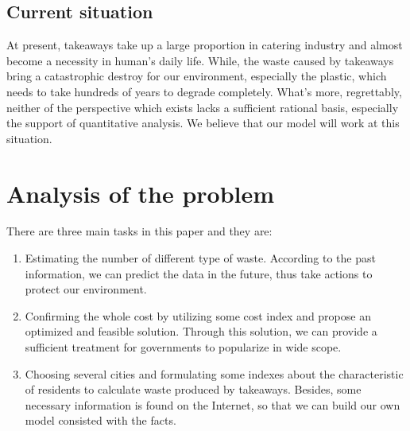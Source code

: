 \documentclass[UTF8]{article}
\begin{document}
\subsection{Current situation}
At present, takeaways take up a large proportion in catering industry and almost become a necessity in human’s daily life. While, the waste caused by takeaways bring a catastrophic destroy for our environment, especially the plastic, which needs to take hundreds of years to degrade completely. What’s more, regrettably, neither of the perspective which exists lacks a sufficient rational basis, especially the support of quantitative analysis. We believe that our model will work at this situation.
\newpage

\section{Analysis of the problem}
There are three main tasks in this paper and they are:\\
\begin{enumerate}
\item Estimating the number of different type of waste. According to the past information, we can predict the data in the future, thus take actions to protect our environment.\\
\item Confirming the whole cost by utilizing some cost index and propose an optimized and feasible solution. Through this solution, we can provide a sufficient treatment for governments to popularize in wide scope.\\
\item Choosing several cities and formulating some indexes about the characteristic of residents to calculate waste produced by takeaways.
Besides, some necessary information is found on the Internet, so that we can build our own model consisted with the facts.
\end{enumerate}
\newpage
\end{document}
